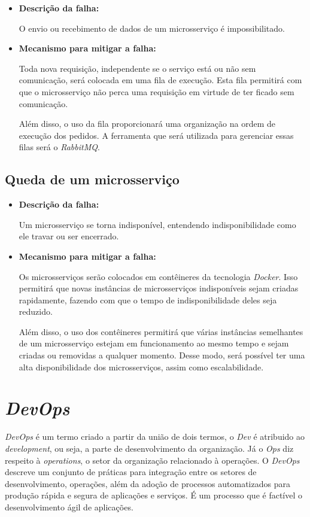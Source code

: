 \begin{itemize}
    \item \textbf{Descrição da falha:}

     O envio ou recebimento de dados de um microsserviço é impossibilitado.

    \item \textbf{Mecanismo para mitigar a falha:}

    Toda nova requisição, independente se o serviço está ou não sem comunicação, será colocada em uma fila de execução. Esta fila permitirá com que o microsserviço não perca uma requisição em virtude de ter ficado sem comunicação.

    Além disso, o uso da fila proporcionará uma organização na ordem de execução dos pedidos. A ferramenta que será utilizada para gerenciar essas filas será o \textit{RabbitMQ}.
\end{itemize}

\subsection{Queda de um microsserviço}

\begin{itemize}
    \item \textbf{Descrição da falha:}

    Um microsserviço se torna indisponível, entendendo indisponibilidade como ele travar ou ser encerrado.

    \item \textbf{Mecanismo para mitigar a falha:}

    Os microsserviços serão colocados em contêineres da tecnologia \textit{Docker}. Isso permitirá que novas instâncias de microsserviços indisponíveis sejam criadas rapidamente, fazendo com que o tempo de indisponibilidade deles seja reduzido.

    Além disso, o uso dos contêineres permitirá que várias instâncias semelhantes de um microsserviço estejam em funcionamento ao mesmo tempo e sejam criadas ou removidas a qualquer momento. Desse modo, será possível ter uma alta disponibilidade dos microsserviços, assim como escalabilidade.
\end{itemize}

\section{\textit{DevOps}}

\textit{DevOps} é um termo criado a partir da união de dois termos, o \textit{Dev} é atribuido ao \textit{development}, ou seja, a parte de desenvolvimento da organização. Já o \textit{Ops} diz respeito à \textit{operations}, o setor da organização relacionado à operações. O \textit{DevOps} descreve um conjunto de práticas para integração entre os setores de desenvolvimento, operações, além da adoção de processos automatizados para produção rápida e segura de aplicações e serviços. É um processo que é factível o desenvolvimento ágil de aplicações.

